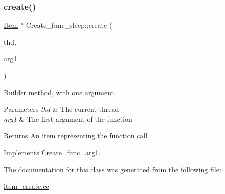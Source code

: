 \subsubsection{\texorpdfstring{create()}{create()}}
{\footnotesize\ttfamily \mbox{\hyperlink{classItem}{Item}} $\ast$ Create\+\_\+func\+\_\+sleep\+::create (\begin{DoxyParamCaption}\item[{T\+HD $\ast$}]{thd,  }\item[{\mbox{\hyperlink{classItem}{Item}} $\ast$}]{arg1 }\end{DoxyParamCaption})\hspace{0.3cm}{\ttfamily [virtual]}}

Builder method, with one argument. 
\begin{DoxyParams}{Parameters}
{\em thd} & The current thread \\
\hline
{\em arg1} & The first argument of the function \\
\hline
\end{DoxyParams}
\begin{DoxyReturn}{Returns}
An item representing the function call 
\end{DoxyReturn}


Implements \mbox{\hyperlink{classCreate__func__arg1_a3e9a98f755cd82c3e762e334c955a8c9}{Create\+\_\+func\+\_\+arg1}}.



The documentation for this class was generated from the following file\+:\begin{DoxyCompactItemize}
\item 
\mbox{\hyperlink{item__create_8cc}{item\+\_\+create.\+cc}}\end{DoxyCompactItemize}
